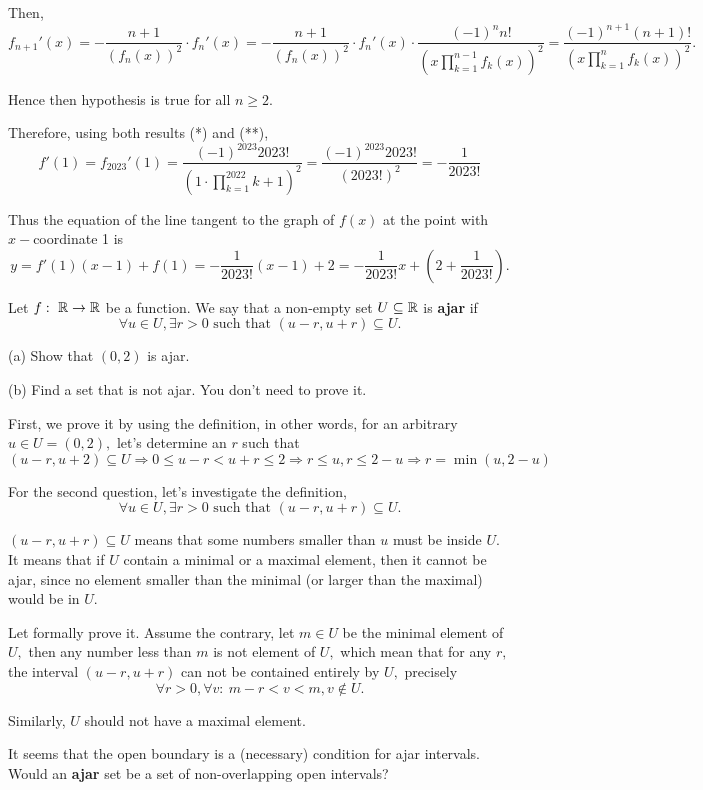 \documentclass{article}
\begin{document}
\begin{soln}
\begin{subproof}
        Then, 
        \[
            f_{n+1}'(x) = -\frac{n+1}{(f_{n}(x))^2} \cdot f_{n}'(x) = -\frac{n+1}{(f_{n}(x))^2} \cdot f_{n}'(x) \cdot \frac{(-1)^{n}n!}{\left(x \prod_{k=1}^{n-1} f_{k}(x) \right)^2}
            = \frac{(-1)^{n+1}(n+1)!}{\left(x \prod_{k=1}^{n} f_{k}(x) \right)^2}.
        \]

        Hence then hypothesis is true for all $n \ge 2.$
    \end{subproof}

    Therefore, using both results (*) and (**),
    \[
        f'(1) = f_{2023}'(1) = \frac{(-1)^{2023}2023!}{\left(1 \cdot \prod_{k=1}^{2022} k+1\right) ^2} = \frac{(-1)^{2023}2023!}{(2023!)^2} = -\frac{1}{2023!}
    \]

    Thus the equation of the line tangent to the graph of $f(x)$ at the point with $x-$coordinate 1 is
    \[
        y = f'(1) (x-1) + f(1) = -\frac{1}{2023!} (x-1) + 2 = \boxed{-\frac{1}{2023!} x + \left(2 + \frac{1}{2023!}\right).}
    \]
\end{soln}

\newpage

\begin{problem*}[Problem 4ab]
    Let $f:\ \mathbb R \rightarrow \mathbb R$ be a function. We say that a non-empty set $U \subseteq \mathbb R$ is \textbf{ajar} if
    \[
        \forall u \in U, \exists r > 0 \text{\ such that\ } (u-r, u+r) \subseteq U.
    \]

    (a) Show that $(0,2)$ is ajar.

    (b) Find a set that is not ajar. You don't need to prove it.
\end{problem*}

\begin{remark*}
    First, we prove it by using the definition, in other words, for an arbitrary $u \in U = (0,2),$ let's determine an $r$ such that
    \[
        (u-r, u+2) \subseteq U \Rightarrow 0 \le u - r < u + r \le 2 \Rightarrow r \le u, r \le 2 - u \Rightarrow r = \min(u, 2-u)
    \]

    For the second question, let's investigate the definition,
    \[
        \forall u \in U, \exists r > 0 \text{\ such that\ } (u-r, u+r) \subseteq U.
    \]
    
    $(u-r, u+r) \subseteq U$ means that some numbers smaller than $u$ must be inside $U.$
    It means that if $U$ contain a minimal or a maximal element, then it cannot be ajar,
    since no element smaller than the minimal (or larger than the maximal) would be in $U.$
    
    Let formally prove it. 
    Assume the contrary, let $m \in U$ be the minimal element of $U,$ then any number less than $m$ is not element of $U,$
    which mean that for any $r,$ the interval $(u-r, u+r)$ can not be contained entirely by $U,$ precisely
    \[
        \forall r > 0, \forall v:\ m-r < v < m, v \not \in U.
    \]

    Similarly, $U$ should not have a maximal element.

    It seems that the open boundary is a (necessary) condition for ajar intervals.
    Would an \textbf{ajar} set be a set of non-overlapping open intervals?
\end{remark*}
\end{document}
